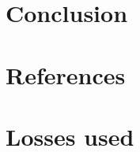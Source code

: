 \documentclass{article}
\begin{document}
\section*{Conclusion}

\newpage
\section*{References}


\newpage
\appendix
\section{Losses used}
\label{appendix-losses}
\end{document}
